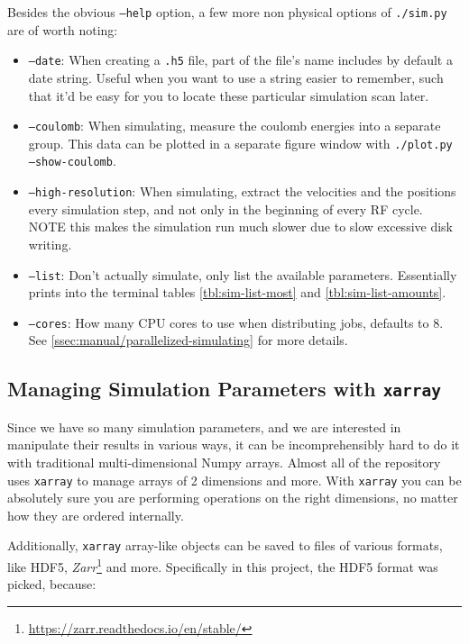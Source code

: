 Besides the obvious \texttt{--help} option, a few more non physical options of \texttt{./sim.py} are of worth noting:

\begin{itemize}
	\item \texttt{--date}: When creating a \texttt{.h5} file, part of the file's name includes by default a date string. Useful when you want to use a string easier to remember, such that it'd be easy for you to locate these particular simulation scan later.
	\item \texttt{--coulomb}: When simulating, measure the coulomb energies into a separate group. This data can be plotted in a separate figure window with \texttt{./plot.py --show-coulomb}.
	\item \texttt{--high-resolution}: When simulating, extract the velocities and the positions every simulation step, and not only in the beginning of every RF cycle. NOTE this makes the simulation run much slower due to slow excessive disk writing.
	\item \texttt{--list}: Don't actually simulate, only list the available parameters. Essentially prints into the terminal tables \ref{tbl:sim-list-most} and \ref{tbl:sim-list-amounts}.
	\item \texttt{--cores}: How many CPU cores to use when distributing jobs, defaults to 8. See \ref{ssec:manual/parallelized-simulating} for more details.
\end{itemize}

\subsection{Managing Simulation Parameters with \texttt{xarray}}

Since we have so many simulation parameters, and we are interested in manipulate their results in various ways, it can be incomprehensibly hard to do it with traditional multi-dimensional Numpy arrays. Almost all of the repository uses \texttt{xarray}\cite{xarray} to manage arrays of 2 dimensions and more. With \texttt{xarray} you can be absolutely sure you are performing operations on the right dimensions, no matter how they are ordered internally.

Additionally, \texttt{xarray} array-like objects can be saved to files of various formats, like HDF5\cite{HDF5}, \textit{Zarr}\footnote{\url{https://zarr.readthedocs.io/en/stable/}} and more. Specifically in this project, the HDF5 format was picked, because:

